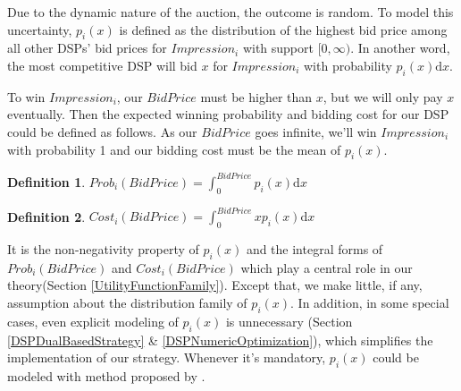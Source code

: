 \documentclass{article}
\newtheorem{definition}{Definition}[section]
\begin{document}
Due to the dynamic nature of the auction, the outcome is random.
To model this uncertainty, $p_i(x)$ is defined as
    the distribution of the highest bid price among all other DSPs' bid prices for $Impression_i$ with support $[0, \infty)$.
In another word, the most competitive DSP will bid $x$ for $Impression_i$ with probability $p_i(x) \mathrm{d} x$.

To win $Impression_i$, our $BidPrice$ must be higher than $x$, but we will only pay $x$ eventually.
Then the expected winning probability and bidding cost for our DSP could be defined as follows.
As our $BidPrice$ goes infinite, we'll win $Impression_i$ with probability 1 and our bidding cost must be the mean of $p_i(x)$.

\begin{definition}
$Prob_i(BidPrice)= \int_0^{BidPrice} p_i(x) \mathrm{d} x$
\end{definition}

\begin{definition}
$Cost_i(BidPrice)= \int_0^{BidPrice} x p_i(x) \mathrm{d} x$
\end{definition}

It is the non-negativity property of $p_i(x)$ and the integral forms of $Prob_i(BidPrice)$ and $Cost_i(BidPrice)$
    which play a central role in our theory(Section \ref{UtilityFunctionFamily}).
Except that, we make little, if any, assumption about the distribution family of $p_i(x)$.
In addition, in some special cases, even explicit modeling of $p_i(x)$ is unnecessary
    (Section \ref{DSPDualBasedStrategy} \& \ref{DSPNumericOptimization}), which simplifies the implementation of our strategy.
Whenever it's mandatory, $p_i(x)$ could be modeled with method proposed by \cite{Wu2015}.

%
%
\end{document}
